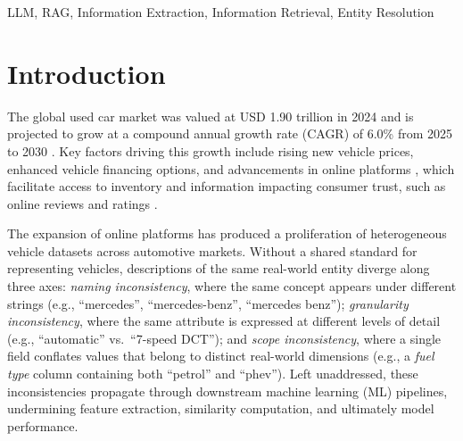 \documentclass[conference]{IEEEtran}
\begin{document}
\begin{IEEEkeywords}
LLM, RAG, Information Extraction, Information Retrieval, Entity Resolution

\end{IEEEkeywords}

\section{Introduction}

The global used car market was valued at USD 1.90 trillion in 2024 and is projected to grow at a compound annual growth rate (CAGR) of 6.0\% from 2025 to 2030 \cite{grandview2024usedcar, hu2025583}. Key factors driving this growth include rising new vehicle prices, enhanced vehicle financing options, and advancements in online platforms \cite{hu2025583, zacharof}, which facilitate access to inventory and information impacting consumer trust, such as online reviews and ratings \cite{zhang2025decoding}.

The expansion of online platforms has produced a proliferation of heterogeneous vehicle datasets across automotive markets. Without a shared standard for representing vehicles, descriptions of the same real-world entity diverge along three axes: \textit{naming inconsistency}, where the same concept appears under different strings (e.g., ``mercedes'', ``mercedes-benz'', ``mercedes benz''); \textit{granularity inconsistency}, where the same attribute is expressed at different levels of detail (e.g., ``automatic'' vs.\ ``7-speed DCT''); and \textit{scope inconsistency}, where a single field conflates values that belong to distinct real-world dimensions (e.g., a \textit{fuel type} column containing both ``petrol'' and ``phev''). Left unaddressed, these inconsistencies propagate through downstream machine learning (ML) pipelines, undermining feature extraction, similarity computation, and ultimately model performance.
\end{document}
